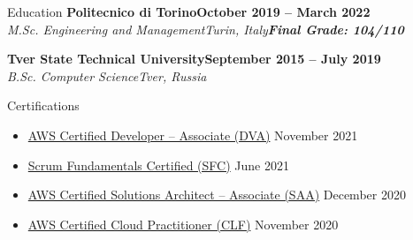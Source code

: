 \documentclass[a4paper]{article}
\newlength{\tabin}
\newlength{\secsep}
\newcommand{\lineunder}{\vspace*{-8pt}\\\hspace*{-6pt}\hrulefill\\\vspace*{-15pt}}
\newcommand{\education}[4]{\vspace{\secsep}\textbf{#1\hfill#2}\\\textit{#3\hfill#4}\vspace{2\secsep}}
\newcommand{\educationwithgrade}[5]{\vspace{\secsep}\textbf{#1\hfill#2}\\\textit{#3\hfill#4}\linebreak\textbf{\textit{#5}}\vspace{2\secsep}}
\newenvironment{tabbedsection}[1]{
  \begin{list}{}{
    \setlength{\itemsep}{0pt}
    \setlength{\labelsep}{0pt}
    \setlength{\labelwidth}{0pt}
    \setlength{\leftmargin}{\tabin}
    \setlength{\rightmargin}{\tabin}
    \setlength{\listparindent}{0pt}
    \setlength{\parsep}{0pt}
    \setlength{\parskip}{0pt}
    \setlength{\partopsep}{0pt}
    \setlength{\topsep}{#1}
  }
  \item[]
}{\end{list}}
\newenvironment{resume_section}[1]{
  \filbreak
  \vspace{2\secsep}
  \textsc{\large#1}
  \lineunder
  \begin{tabbedsection}{\secsep}
}{\end{tabbedsection}}
\newenvironment{subitems}{
  \renewcommand{\labelitemi}{-}
  \begin{itemize}
  \setlength{\labelsep}{1em}
}{\end{itemize}}
\begin{document}
\begin{resume_section}{Education}
  \educationwithgrade{Politecnico di Torino}{October 2019 -- March 2022}{M.Sc. Engineering and Management}{Turin, Italy}{Final Grade: 104/110}

  \education{Tver State Technical University}{September 2015 -- July 2019}{B.Sc. Computer Science}{Tver, Russia}
\end{resume_section}

\begin{resume_section}{Certifications}
  \begin{subitems}
    \item \href{https://www.credly.com/badges/4af15df4-f5b2-4d6b-b989-bb47e71c9986}{AWS Certified Developer -- Associate (DVA)} \hfill November 2021
    \item \href{https://www.scrumstudy.com/certification/verify?type=SFC&number=848920}{Scrum Fundamentals Certified (SFC)} \hfill June 2021
    \item \href{https://www.credly.com/badges/52a6f0ff-d46a-4d42-9bb1-ea2b7fb01526}{AWS Certified Solutions Architect -- Associate (SAA)} \hfill December 2020
    \item \href{https://www.credly.com/badges/488ba1a8-a95a-46f5-943b-c275bc7e6178}{AWS Certified Cloud Practitioner (CLF)} \hfill November 2020
  \end{subitems}
\end{resume_section}
\end{document}
